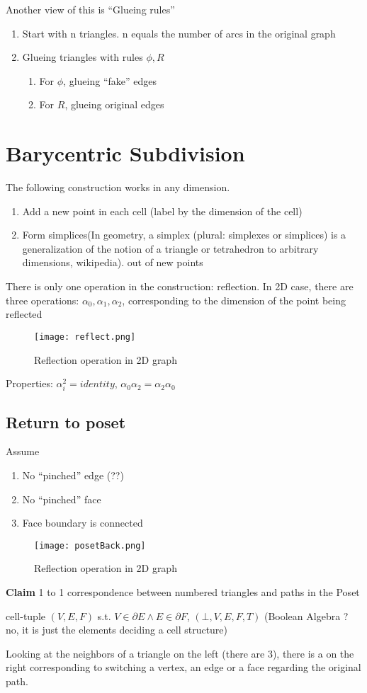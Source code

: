 \documentclass[12pt]{article}
\newcommand{\claim}[1]{\par {\bf Claim }{#1}}
\begin{document}
Another view of this is ``Glueing rules''
\begin{enumerate}[1)]
\item Start with n triangles. n equals the number of arcs in the
  original graph
\item Glueing triangles with rules $\phi, R$
  \begin{enumerate}
  \item For $\phi$, glueing ``fake'' edges
  \item For $R$, glueing original edges
  \end{enumerate}
\end{enumerate}
\section{Barycentric Subdivision}
The following construction works in any dimension.
\begin{enumerate}[1)]
\item Add a new point in each cell (label by the dimension of the
  cell)
\item Form simplices(In geometry, a simplex (plural: simplexes or
  simplices) is a generalization of the notion of a triangle or
  tetrahedron to arbitrary dimensions, wikipedia).  out of new points
\end{enumerate}
There is only one operation in the construction: reflection. In 2D
case, there are three operations: $\alpha_0, \alpha_1, \alpha_2$,
corresponding to the dimension of the point being reflected
\begin{figure}[h!]
  \centering
  \texttt{[image: reflect.png]}
  \caption{Reflection operation in 2D graph}
  \label{fig:reflect}
\end{figure}
Properties: $\alpha_i^2 = identity$,
$\alpha_0\alpha_2 = \alpha_2\alpha_0$
\subsection{Return to poset}
Assume
\begin{enumerate}[1)]
\item No ``pinched'' edge (??)
\item No ``pinched'' face
\item Face boundary is connected
\end{enumerate}
\begin{figure}[h!]
  \centering
  \texttt{[image: posetBack.png]}
  \caption{Reflection operation in 2D graph}
  \label{fig:posetBack}
\end{figure}
\claim{1 to 1 correspondence between numbered triangles and paths in
  the Poset}
\begin{definition}
  cell-tuple $(V, E, F)$ s.t.
  $V \in \partial E \land E \in \partial F$, $(\bot, V, E, F, T)$
  (Boolean Algebra ? no, it is just the elements deciding a cell
  structure)
\end{definition}
Looking at the neighbors of a triangle on the left (there are 3),
there is a on the right corresponding to switching a vertex, an edge
or a face regarding the original path.
\end{document}
